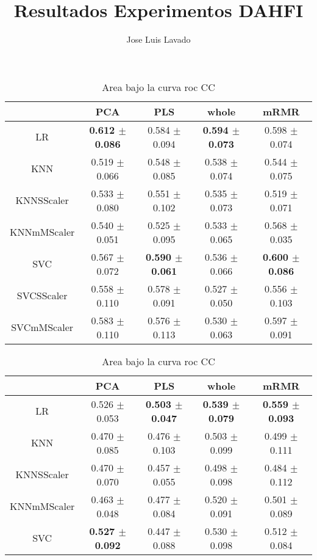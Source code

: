 \documentclass[]{report}
\title{Resultados Experimentos DAHFI}
\author{Jose Luis Lavado}
\begin{document}
\maketitle

	\begin{table}
		\centering
		\setlength{\aboverulesep}{0pt}
		\setlength{\belowrulesep}{0pt}
		\begin{tabular}{c|cccc}
			\hline
			             & PCA             & PLS             & whole           & mRMR            \\
			\hline
			 LR          & \textbf{0.612 $\pm$ 0.086} & 0.584 $\pm$ 0.094 & \textbf{0.594 $\pm$ 0.073} & 0.598 $\pm$ 0.074 \\
			 KNN         & 0.519 $\pm$ 0.066 & 0.548 $\pm$ 0.085 & 0.538 $\pm$ 0.074 & 0.544 $\pm$ 0.075 \\
			 KNNSScaler  & 0.533 $\pm$ 0.080 & 0.551 $\pm$ 0.102 & 0.535 $\pm$ 0.073 & 0.519 $\pm$ 0.071 \\
			 KNNmMScaler & 0.540 $\pm$ 0.051 & 0.525 $\pm$ 0.095 & 0.533 $\pm$ 0.065 & 0.568 $\pm$ 0.035 \\
			 SVC         & 0.567 $\pm$ 0.072 & \textbf{0.590 $\pm$ 0.061} & 0.536 $\pm$ 0.066 & \textbf{0.600 $\pm$ 0.086} \\
			 SVCSScaler  & 0.558 $\pm$ 0.110 & 0.578 $\pm$ 0.091 & 0.527 $\pm$ 0.050 & 0.556 $\pm$ 0.103 \\
			 SVCmMScaler & 0.583 $\pm$ 0.110 & 0.576 $\pm$ 0.113 & 0.530 $\pm$ 0.063 & 0.597 $\pm$ 0.091 \\
			\hline
		\end{tabular}
		\caption{\label{tab:auc_score_CC} Area bajo la curva roc CC}
		\vspace*{2cm}
		\begin{tabular}{c|cccc}
			\hline
			             & PCA             & PLS             & whole           & mRMR            \\
			\hline
			 LR          & 0.526 $\pm$ 0.053 & \textbf{0.503 $\pm$ 0.047} & \textbf{0.539 $\pm$ 0.079} & \textbf{0.559 $\pm$ 0.093} \\
			 KNN         & 0.470 $\pm$ 0.085 & 0.476 $\pm$ 0.103 & 0.503 $\pm$ 0.099 & 0.499 $\pm$ 0.111 \\
			 KNNSScaler  & 0.470 $\pm$ 0.070 & 0.457 $\pm$ 0.055 & 0.498 $\pm$ 0.098 & 0.484 $\pm$ 0.112 \\
			 KNNmMScaler & 0.463 $\pm$ 0.048 & 0.477 $\pm$ 0.084 & 0.520 $\pm$ 0.091 & 0.501 $\pm$ 0.089 \\
			 SVC         & \textbf{0.527 $\pm$ 0.092} & 0.447 $\pm$ 0.088 & 0.530 $\pm$ 0.098 & 0.512 $\pm$ 0.084 \\

\end{tabular}
\end{table}
\end{document}
